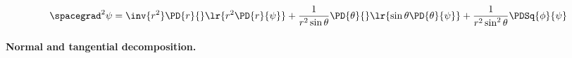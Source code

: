 \begin{dmath}\label{eqn:usefulFormulas:940}
\spacegrad^2 \psi
=
    \inv{r^2} \PD{r}{} \lr{ r^2 \PD{r}{ \psi} }
   + \frac{1}{r^2 \sin\theta} \PD{\theta}{} \lr{ \sin\theta \PD{\theta}{ \psi } }
   + \frac{1}{r^2 \sin^2\theta} \PDSq{\phi}{ \psi}
\end{dmath}

\paragraph{Normal and tangential decomposition.}


